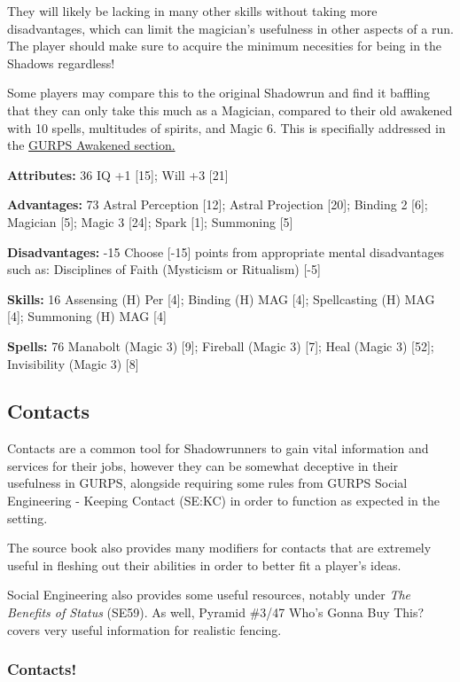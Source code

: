 \begin{multicols*}{2}
	They will likely be lacking in many other skills without taking more disadvantages, which can limit the magician's usefulness in other aspects of a run. The player should make sure to acquire the minimum necesities for being in the Shadows regardless!
	
	Some players may compare this to the original Shadowrun and find it baffling that they can only take this much as a Magician, compared to their old awakened with 10 spells, multitudes of spirits, and Magic 6. This is specifially addressed in the \hyperref[gurps_awakened]{GURPS Awakened section.}
	
	\textbf{Attributes: } 36
	IQ +1 [15]; Will +3 [21]
	
	\textbf{Advantages: } 73
	Astral Perception [12]; Astral Projection [20]; Binding 2 [6]; Magician [5]; Magic 3 [24]; Spark [1]; Summoning [5]
	
	\textbf{Disadvantages: } -15
	Choose [-15] points from appropriate mental disadvantages such as:
	Disciplines of Faith (Mysticism or Ritualism) [-5]
	
	\textbf{Skills: } 16
	Assensing (H) Per [4]; Binding (H) MAG [4]; Spellcasting (H) MAG [4]; Summoning (H) MAG [4]
	
	\textbf{Spells: } 76
	Manabolt (Magic 3) [9]; Fireball (Magic 3) [7]; Heal (Magic 3) [52]; Invisibility (Magic 3) [8]
	
	\subsection{Contacts}\label{Contacts}
	
	Contacts are a common tool for Shadowrunners to gain vital information and services for their jobs, however they can be somewhat deceptive in their usefulness in GURPS, alongside requiring some rules from GURPS Social Engineering - Keeping Contact (SE:KC) in order to function as expected in the setting.
	
	The source book also provides many modifiers for contacts that are extremely useful in fleshing out their abilities in order to better fit a player's ideas.
	
	Social Engineering also provides some useful resources, notably under \textit{The Benefits of Status} (SE59). As well, Pyramid \#3/47 Who's Gonna Buy This? covers very useful information for realistic fencing.
	
	\subsubsection{Contacts!}
	

\end{multicols*}
